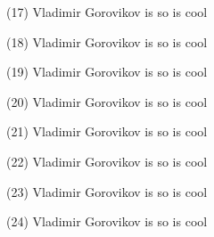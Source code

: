 \documentclass{article}%
\begin{document}
\begin{minipage}{0.3333333333333333\textwidth}%
(17) Vladimir Gorovikov%
\newline%
%
is so%
\newline%
%
is cool%
\newline%
%
\end{minipage}%
\begin{minipage}{0.3333333333333333\textwidth}%
(18) Vladimir Gorovikov%
\newline%
%
is so%
\newline%
%
is cool%
\newline%
%
\end{minipage}%
\newline%
\begin{minipage}{0.3333333333333333\textwidth}%
(19) Vladimir Gorovikov%
\newline%
%
is so%
\newline%
%
is cool%
\newline%
%
\end{minipage}%
\begin{minipage}{0.3333333333333333\textwidth}%
(20) Vladimir Gorovikov%
\newline%
%
is so%
\newline%
%
is cool%
\newline%
%
\end{minipage}%
\begin{minipage}{0.3333333333333333\textwidth}%
(21) Vladimir Gorovikov%
\newline%
%
is so%
\newline%
%
is cool%
\newline%
%
\end{minipage}%
\newline%
\begin{minipage}{0.3333333333333333\textwidth}%
(22) Vladimir Gorovikov%
\newline%
%
is so%
\newline%
%
is cool%
\newline%
%
\end{minipage}%
\begin{minipage}{0.3333333333333333\textwidth}%
(23) Vladimir Gorovikov%
\newline%
%
is so%
\newline%
%
is cool%
\newline%
%
\end{minipage}%
\begin{minipage}{0.3333333333333333\textwidth}%
(24) Vladimir Gorovikov%
\newline%
%
is so%
\newline%
%
is cool%
\newline%
%
\end{minipage}%
\end{document}
